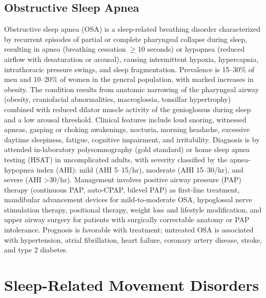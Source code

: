 \subsection{Obstructive Sleep Apnea}
\label{sec:Obstructive Sleep Apnea}
Obstructive sleep apnea (OSA) is a sleep-related breathing disorder characterized by recurrent episodes of partial or complete pharyngeal collapse during sleep, resulting in apnea (breathing cessation $\ge$10 seconds) or hypopnea (reduced airflow with desaturation or arousal), causing intermittent hypoxia, hypercapnia, intrathoracic pressure swings, and sleep fragmentation. Prevalence is 15--30\% of men and 10--20\% of women in the general population, with marked increases in obesity. The condition results from anatomic narrowing of the pharyngeal airway (obesity, craniofacial abnormalities, macroglossia, tonsillar hypertrophy) combined with reduced dilator muscle activity of the genioglossus during sleep and a low arousal threshold. Clinical features include loud snoring, witnessed apneas, gasping or choking awakenings, nocturia, morning headache, excessive daytime sleepiness, fatigue, cognitive impairment, and irritability. Diagnosis is by attended in-laboratory polysomnography (gold standard) or home sleep apnea testing (HSAT) in uncomplicated adults, with severity classified by the apnea-hypopnea index (AHI): mild (AHI 5--15/hr), moderate (AHI 15--30/hr), and severe (AHI >30/hr). Management involves positive airway pressure (PAP) therapy (continuous PAP, auto-CPAP, bilevel PAP) as first-line treatment, mandibular advancement devices for mild-to-moderate OSA, hypoglossal nerve stimulation therapy, positional therapy, weight loss and lifestyle modification, and upper airway surgery for patients with surgically correctable anatomy or PAP intolerance. Prognosis is favorable with treatment; untreated OSA is associated with hypertension, atrial fibrillation, heart failure, coronary artery disease, stroke, and type 2 diabetes.

\section{Sleep-Related Movement Disorders}



